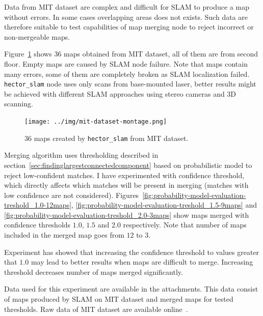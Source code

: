 Data from \gls{MIT} dataset are complex and difficult for \gls{SLAM} to produce a map without errors. In some cases overlapping areas does not exists. Such data are therefore suitable to test capabilities of map merging node to reject incorrect or non-mergeable maps.

Figure~\ref{fig:probability-model-evaluation-montage} shows $36$ maps obtained from \gls{MIT} dataset, all of them are from second floor. Empty maps are caused by \gls{SLAM} node failure. Note that maps contain many errors, some of them are completely broken as \gls{SLAM} localization failed. \texttt{hector\_slam} node uses only scans from base-mounted laser, better results might be achieved with different \gls{SLAM} approaches using stereo cameras and 3D scanning.

\begin{figure}
    \centering
    \texttt{[image: ../img/mit-dataset-montage.png]}
    \caption{$36$ maps created by \texttt{hector\_slam} from \gls{MIT} dataset.}
    \label{fig:probability-model-evaluation-montage}
\end{figure}

Merging algorithm uses thresholding described in section~\ref{sec:findinglargestconnectedcomponent} based on probabilistic model to reject low-confident matches. I have experimented with confidence threshold, which directly affects which matches will be present in merging (matches with low confidence are not considered). Figures~\ref{fig:probability-model-evaluation-treshold_1.0-12maps}, \ref{fig:probability-model-evaluation-treshold_1.5-9maps} and \ref{fig:probability-model-evaluation-treshold_2.0-3maps} show maps merged with confidence thresholds $1.0$, $1.5$ and $2.0$ respectively. Note that number of maps included in the merged map goes from $12$ to $3$.

Experiment has showed that increasing the confidence threshold to values greater that $1.0$ may lead to better results when maps are difficult to merge. Increasing threshold decreases number of maps merged significantly.

Data used for this experiment are available in the attachments. This data consist of maps produced by \gls{SLAM} on \gls{MIT} dataset and merged maps for tested thresholds. Raw data of \gls{MIT} dataset are available online~\cite{Fallon2013}.

